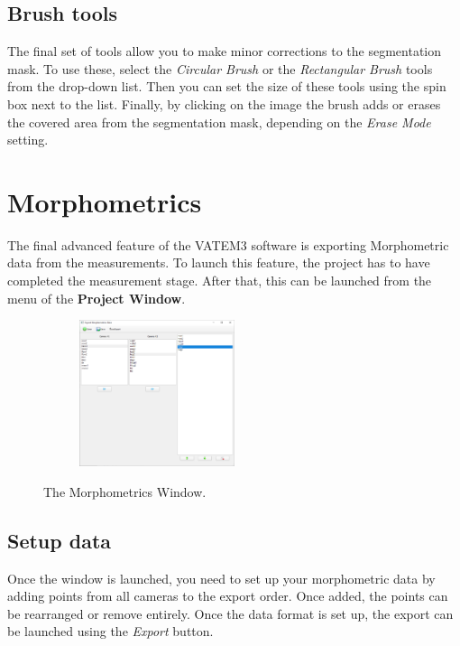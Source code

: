 \documentclass[10pt,a4paper,oneside]{report}             %
\begin{document}
\subsection{Brush tools}

The final set of tools allow you to make minor corrections to the segmentation mask. To use these, select the \textit{Circular Brush} or the \textit{Rectangular Brush} tools from the drop-down list. Then you can set the size of these tools using the spin box next to the list. Finally, by clicking on the image the brush adds or erases the covered area from the segmentation mask, depending on the \textit{Erase Mode} setting.

\section{Morphometrics}

The final advanced feature of the VATEM3 software is exporting Morphometric data from the measurements. To launch this feature, the project has to have completed the measurement stage. After that, this can be launched from the  menu of the \textbf{Project Window}. 

\begin{figure}[H]
	\centering
	\begin{subfigure}{\textwidth}
		\centering 
		\includegraphics[width=0.5\textwidth]{./images/Morpho.png}
	\end{subfigure}
	\caption[]
	{\small  The Morphometrics Window.}
\end{figure} 

\subsection{Setup data}

Once the window is launched, you need to set up your morphometric data by adding points from all cameras to the export order. Once added, the points can be rearranged or remove entirely. Once the data format is set up, the export can be launched using the \textit{Export} button.
\end{document}
